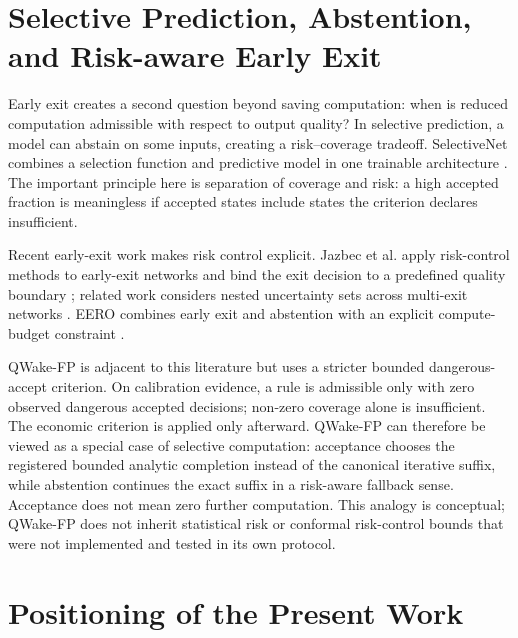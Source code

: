 \section{Selective Prediction, Abstention, and Risk-aware Early Exit}
\label{sec:related-selective}

Early exit creates a second question beyond saving computation: when is reduced
computation admissible with respect to output quality? In selective prediction, a
model can abstain on some inputs, creating a risk--coverage tradeoff. SelectiveNet
combines a selection function and predictive model in one trainable architecture
\cite{geifman2019selectivenet}. The important principle here is separation of coverage
and risk: a high accepted fraction is meaningless if accepted states include states
the criterion declares insufficient.

Recent early-exit work makes risk control explicit. Jazbec et al. apply risk-control
methods to early-exit networks and bind the exit decision to a predefined quality
boundary \cite{jazbec2024riskcontrol}; related work considers nested uncertainty sets
across multi-exit networks \cite{jazbec2024nested}. EERO combines early exit and
abstention with an explicit compute-budget constraint \cite{valade2025eero}.

QWake-FP is adjacent to this literature but uses a stricter bounded dangerous-accept
criterion. On calibration evidence, a rule is admissible only with zero observed
dangerous accepted decisions; non-zero coverage alone is insufficient. The economic
criterion is applied only afterward. QWake-FP can therefore be viewed as a special
case of selective computation: acceptance chooses the registered bounded analytic
completion instead of the canonical iterative suffix, while abstention continues the
exact suffix in a risk-aware fallback sense. Acceptance does not mean zero further
computation. This analogy is conceptual; QWake-FP does not inherit statistical risk
or conformal risk-control bounds that were not implemented and tested in its own protocol.

\section{Positioning of the Present Work}
\label{sec:related-positioning}

